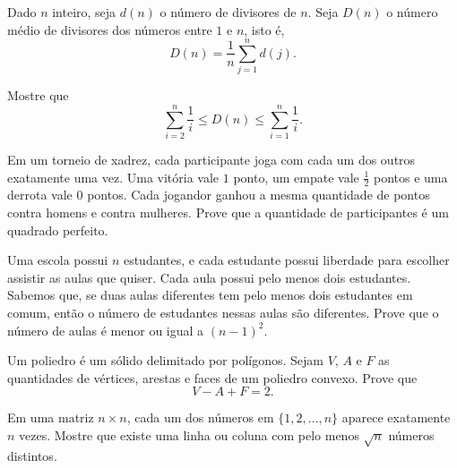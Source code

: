 \documentclass[10pt, a4paper]{article}
\begin{document}
	\begin{prob} %
		Dado $n$ inteiro, seja $d(n)$ o número de divisores de $n$. Seja $D(n)$ o número médio de divisores dos números entre $1$ e $n$, isto é, \[D(n) = \frac{1}{n} \sum_{j=1}^{n} d(j).\]

		Mostre que \[\sum_{i=2}^n \frac{1}{i} \le D(n) \le \sum_{i=1}^n \frac{1}{i}.\]
	\end{prob}

	\begin{prob}[OBM] %
		Em um torneio de xadrez, cada participante joga com cada um dos outros exatamente uma vez. Uma vitória vale $1$ ponto, um empate vale $\frac{1}{2}$ pontos e uma derrota vale $0$ pontos. Cada jogandor ganhou a mesma quantidade de pontos contra homens e contra mulheres. Prove que a quantidade de participantes é um quadrado perfeito.
	\end{prob}


	\begin{prob}[Irã 2010, 6]
		Uma escola possui $n$ estudantes, e cada estudante possui liberdade para escolher assistir as aulas que quiser. Cada aula possui pelo menos dois estudantes. Sabemos que, se duas aulas diferentes tem pelo menos dois estudantes em comum, então o número de estudantes nessas aulas são diferentes. Prove que o número de aulas é menor ou igual a $(n - 1)^2$.
	\end{prob} %


	\begin{prob} %
		Um poliedro é um sólido delimitado por polígonos. Sejam $V$, $A$ e $F$ as quantidades de vértices, arestas e faces de um poliedro convexo. Prove que \[V - A + F = 2.\]
	\end{prob}

	
	\begin{prob}
		Em uma matriz $n \times n$, cada um dos números em $\{1, 2, \dots , n\}$ aparece exatamente $n$ vezes. Mostre que existe uma linha ou coluna com pelo menos $\sqrt{n}$ números distintos.
	\end{prob}
	
\end{document}
